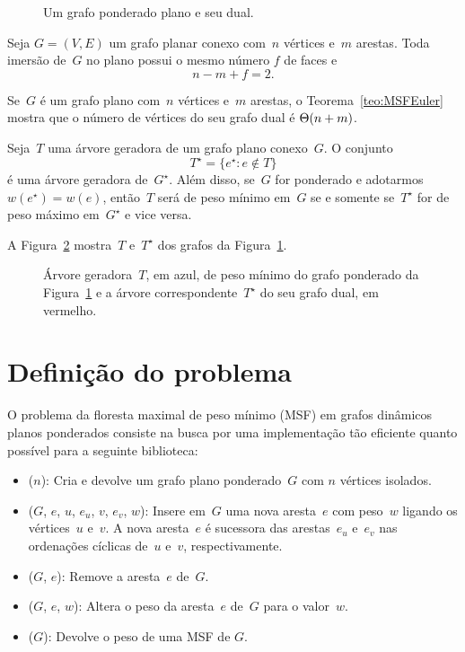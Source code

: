 \begin{figure}[htb]
\scalebox{1.5}{
\centering

}
\caption{Um grafo ponderado plano e seu dual.}
\label{fig:MSF-basico-1}
\end{figure}

\begin{theorem}
\label{teo:MSFEuler}
Seja $G=(V,E)$ um grafo planar conexo com~$n$ vértices e~$m$ arestas. Toda imersão de~$G$ no plano possui o mesmo número $f$ de faces e
$$
n-m+f = 2.
$$
\end{theorem}

Se~$G$ é um grafo plano com~$n$ vértices e~$m$ arestas, o Teorema~\ref{teo:MSFEuler} mostra que o número de vértices do seu grafo dual é $\Theta(n+m)$.

\begin{theorem}
\label{teo:MSFdual}
Seja~$T$ uma árvore geradora de um grafo plano conexo~$G$. O conjunto
$$
T^\star = \{e^\star:e\notin T\}
$$
é uma árvore geradora de~$G^\star$.
Além disso, se~$G$ for ponderado e adotarmos $w(e^\star) = w(e)$, então~$T$ será de peso mínimo em~$G$ se e somente se~$T^\star$ for de peso máximo em~$G^\star$ e vice versa.
\end{theorem}

A Figura~\ref{fig:MSF-figura-2} mostra~$T$ e~$T^\star$ dos grafos da Figura~\ref{fig:MSF-basico-1}.

\begin{figure}[htb]
\scalebox{1.5}{
\centering

}
\caption{Árvore geradora~$T$, em azul, de peso mínimo do grafo ponderado da Figura~\ref{fig:MSF-basico-1} e a árvore correspondente~$T^\star$ do seu grafo dual, em vermelho.}
\label{fig:MSF-figura-2}
\end{figure}





\section{Definição do problema}
\label{sec:definition-MSF}
O problema da floresta maximal de peso mínimo (MSF) em grafos dinâmicos planos ponderados consiste na busca por uma implementação tão eficiente quanto possível para a seguinte biblioteca:

\begin{itemize}
\item \MSFCreate($n$): Cria e devolve um grafo plano ponderado~$G$ com $n$ vértices isolados.
\item \MSFaddEdge($G$, $e$, $u$, $e_u$, $v$, $e_v$, $w$): Insere em~$G$ uma nova aresta~$e$ com peso~$w$ ligando os vértices~$u$ e~$v$. A nova aresta~$e$ é sucessora das arestas~$e_u$ e~$e_v$ nas ordenações cíclicas de~$u$ e~$v$, respectivamente.
\item \MSFdelEdge($G$, $e$): Remove a aresta~$e$ de~$G$.
\item \MSFupdate($G$, $e$, $w$): Altera o peso da aresta~$e$ de~$G$ para o valor~$w$.
\item \MSFweight($G$): Devolve o peso de uma MSF de $G$.
\end{itemize}


